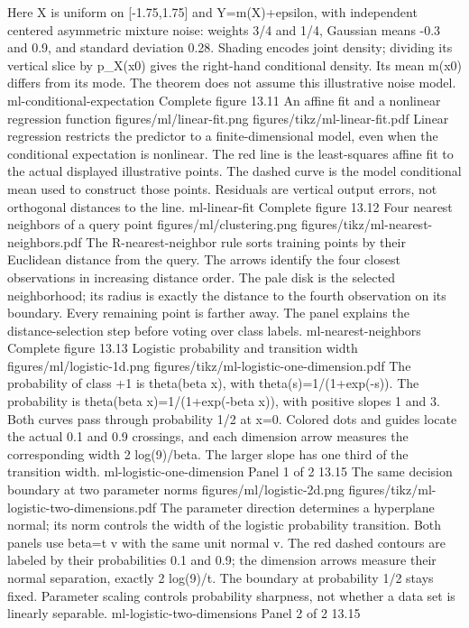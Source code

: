 {Here X is uniform on [-1.75,1.75] and Y=m(X)+epsilon, with independent centered asymmetric mixture noise: weights 3/4 and 1/4, Gaussian means -0.3 and 0.9, and standard deviation 0.28. Shading encodes joint density; dividing its vertical slice by p\_X(x0) gives the right-hand conditional density. Its mean m(x0) differs from its mode. The theorem does not assume this illustrative noise model.}
{ml-conditional-expectation}
{Complete figure}
{13.11}
{An affine fit and a nonlinear regression function}
{figures/ml/linear-fit.png}
{figures/tikz/ml-linear-fit.pdf}
{Linear regression restricts the predictor to a finite-dimensional model, even when the conditional expectation is nonlinear.}
{The red line is the least-squares affine fit to the actual displayed illustrative points. The dashed curve is the model conditional mean used to construct those points. Residuals are vertical output errors, not orthogonal distances to the line.}
{ml-linear-fit}
{Complete figure}
{13.12}
{Four nearest neighbors of a query point}
{figures/ml/clustering.png}
{figures/tikz/ml-nearest-neighbors.pdf}
{The R-nearest-neighbor rule sorts training points by their Euclidean distance from the query.}
{The arrows identify the four closest observations in increasing distance order. The pale disk is the selected neighborhood; its radius is exactly the distance to the fourth observation on its boundary. Every remaining point is farther away. The panel explains the distance-selection step before voting over class labels.}
{ml-nearest-neighbors}
{Complete figure}
{13.13}
{Logistic probability and transition width}
{figures/ml/logistic-1d.png}
{figures/tikz/ml-logistic-one-dimension.pdf}
{The probability of class +1 is theta(beta x), with theta(s)=1/(1+exp(-s)).}
{The probability is theta(beta x)=1/(1+exp(-beta x)), with positive slopes 1 and 3. Both curves pass through probability 1/2 at x=0. Colored dots and guides locate the actual 0.1 and 0.9 crossings, and each dimension arrow measures the corresponding width 2 log(9)/beta. The larger slope has one third of the transition width.}
{ml-logistic-one-dimension}
{Panel 1 of 2}
{13.15}
{The same decision boundary at two parameter norms}
{figures/ml/logistic-2d.png}
{figures/tikz/ml-logistic-two-dimensions.pdf}
{The parameter direction determines a hyperplane normal; its norm controls the width of the logistic probability transition.}
{Both panels use beta=t v with the same unit normal v. The red dashed contours are labeled by their probabilities 0.1 and 0.9; the dimension arrows measure their normal separation, exactly 2 log(9)/t. The boundary at probability 1/2 stays fixed. Parameter scaling controls probability sharpness, not whether a data set is linearly separable.}
{ml-logistic-two-dimensions}
{Panel 2 of 2}
{13.15}
